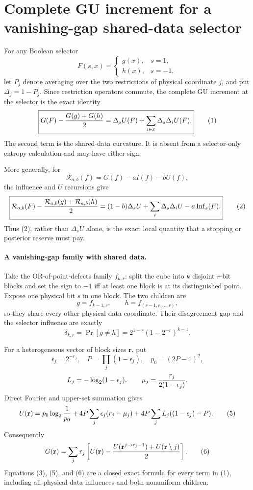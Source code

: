 \section*{Complete GU increment for a vanishing-gap shared-data selector}

For any Boolean selector
\[
 F(s,x)=\begin{cases}g(x),&s=1,\\h(x),&s=-1,\end{cases}
\]
let $P_j$ denote averaging over the two restrictions of physical coordinate
$j$, and put $\Delta_j=1-P_j$.  Since restriction operators commute, the
complete GU increment at the selector is the exact identity
\[
 \boxed{G(F)-{G(g)+G(h)\over2}
 =\Delta_sU(F)+\sum_{i\in x}\Delta_s\Delta_iU(F).}     \tag{1}
\]
The second term is the shared-data curvature.  It is absent from a
selector-only entropy calculation and may have either sign.

More generally, for
\[
 \mathcal R_{a,b}(f)=G(f)-aI(f)-bU(f),
\]
the influence and $U$ recursions give
\[
 \boxed{\mathcal R_{a,b}(F)-{\mathcal R_{a,b}(g)+
 \mathcal R_{a,b}(h)\over2}
 =(1-b)\Delta_sU+\sum_i\Delta_s\Delta_iU-a\operatorname{Inf}_s(F).}
                                                               \tag{2}
\]
Thus (2), rather than $\Delta_sU$ alone, is the exact local quantity that a
stopping or posterior reserve must pay.

\paragraph{A vanishing-gap family with shared data.}
Take the OR-of-point-defects family $f_{k,r}$: split the cube into $k$
disjoint $r$-bit blocks and set the sign to $-1$ iff at least one block is
at its distinguished point.  Expose one physical bit $s$ in one block.
The two children are
\[
 g=f_{k-1,r},\qquad h=f_{(r-1,r,\ldots,r)},             \tag{3}
\]
so they share every other physical data coordinate.  Their disagreement
gap and the selector influence are exactly
\[
 \delta_{k,r}=\Pr[g\ne h]=2^{1-r}(1-2^{-r})^{k-1}.     \tag{4}
\]

For a heterogeneous vector of block sizes $\mathbf r$, put
\[
 \epsilon_j=2^{-r_j},\quad P=\prod_j(1-\epsilon_j),
 \quad p_0=(2P-1)^2,
\]
\[
 L_j=-\log_2(1-\epsilon_j),\qquad
 \mu_j={r_j\over2(1-\epsilon_j)}.
\]
Direct Fourier and upper-set summation gives
\[
 U(\mathbf r)=p_0\log_2{1\over p_0}
 +4P\sum_j\epsilon_j(r_j-\mu_j)
 +4P\sum_jL_j((1-\epsilon_j)-P).                       \tag{5}
\]
Consequently
\[
 G(\mathbf r)=\sum_j r_j\left[U(\mathbf r)-
 {U(\mathbf r^{j\to r_j-1})+U(\mathbf r\setminus j)\over2}\right].
                                                               \tag{6}
\]
Equations (3), (5), and (6) are a closed exact formula for every term in
(1), including all physical data influences and both nonuniform children.

